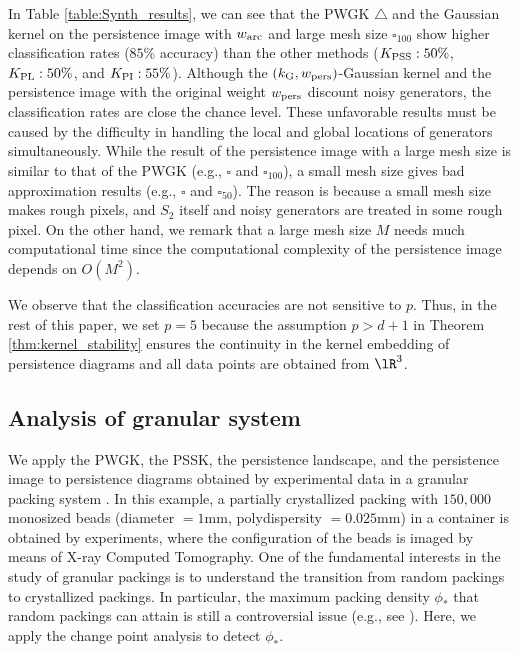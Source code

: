 \documentclass{article}
\begin{document}
In Table \ref{table:Synth_results}, we can see that the PWGK $\triangle$ and the Gaussian kernel on the persistence image with $w_{{\rm arc}}$ and large mesh size $\square_{100}$ show higher classification rates ($85\%$ accuracy) than the other methods ($K_{{\rm PSS}}: 50\%$, $K_{{\rm PL}}: 50\%$, and $K_{{\rm PI}}: 55\%$).
Although the $(k_{{\rm G}},w_{{\rm pers}})$-Gaussian kernel and the persistence image with the original weight $w_{{\rm pers}}$ discount noisy generators, the classification rates are close the chance level.
These unfavorable results must be caused by the difficulty in handling the local and global locations of generators simultaneously.
While the result of the persistence image with a large mesh size is similar to that of the PWGK (e.g., $\square$ and $\square_{100}$), a small mesh size gives bad approximation results (e.g., $\square$ and $\square_{50}$).
The reason is because a small mesh size makes rough pixels, and $S_{2}$ itself and noisy generators are treated in some rough pixel.
On the other hand, we remark that a large mesh size $M$ needs much computational time since the computational complexity of the persistence image depends on $O(M^{2})$.  

We observe that the classification accuracies are not sensitive to $p$. 
Thus, in the rest of this paper, we set $p=5$ because the assumption $p>d+1$ in Theorem \ref{thm:kernel_stability} ensures the continuity in the kernel embedding of persistence diagrams and all data points are obtained from $\lR^{3}$.


\subsection{Analysis of granular system}
\label{subsec:granular} 

We apply the PWGK, the PSSK, the persistence landscape, and the persistence image to persistence diagrams obtained by experimental data in a granular packing system \cite{FSCS11}.
In this example, a partially crystallized packing with $150,000$ monosized beads (diameter $=1$mm, polydispersity $=0.025$mm) in a container is obtained by experiments, where the configuration of the beads is imaged by means of X-ray Computed Tomography.
One of the fundamental interests in the study of granular packings is to understand the transition from random packings to crystallized packings.
In particular, the maximum packing density $\phi_*$ that random packings can attain is still a controversial issue (e.g., see \cite{TTD00}).
Here, we apply the change point analysis to detect $\phi_*$.  
\end{document}
